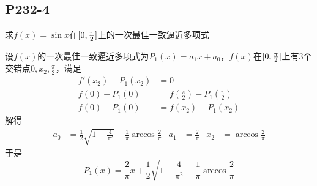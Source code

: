 \subsection{P232-4}
\renewcommand{\FX}{\sin x}
\renewcommand{\LRANGE}{0}
\renewcommand{\RRANGE}{\frac{\pi}{2}}
求$f(x) = \sin{x}$在$\RANGE$上的一次最佳一致逼近多项式
\begin{SOLVE}
设$f(x)$的一次最佳一致逼近多项式为$P_1(x) = a_1 x + a_0$，$f(x)$在$\RANGE$上有3个交错点$\LRANGE, x_2, \RRANGE$，满足
\begin{align*}
f'(x_2) - P_1(x_2)        & = 0\\
f(\LRANGE) - P_1(\LRANGE) & = f(\RRANGE) - P_1(\RRANGE)\\
f(\LRANGE) - P_1(\LRANGE) & = f(x_2) - P_1(x_2)
\end{align*}
解得
\begin{align*}
a_0    & = \frac{1}{2} \sqrt{1-\frac{4}{\pi^2}} - \frac{1}{\pi} \arccos{\frac{2}{\pi}} &
a_1    & = \frac{2}{\pi} &
x_2    & = \arccos{\frac{2}{\pi}}
\end{align*}
于是
\begin{displaymath}
P_1(x) = \frac{2}{\pi} x + \frac{1}{2} \sqrt{1-\frac{4}{\pi^2}} - \frac{1}{\pi} \arccos{\frac{2}{\pi}}
\end{displaymath}
\end{SOLVE}
